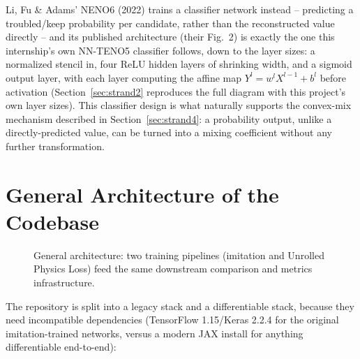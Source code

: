 \documentclass[11pt]{article}
\begin{document}
Li, Fu \& Adams' NENO6 (2022) trains a classifier network instead --
predicting a troubled/keep probability per candidate, rather than the
reconstructed value directly -- and its published architecture (their
Fig.~2) is exactly the one this internship's own NN-TENO5 classifier
follows, down to the layer sizes: a normalized stencil in, four ReLU
hidden layers of shrinking width, and a sigmoid output layer, with each
layer computing the affine map $Y^l = w^l X^{l-1} + b^l$ before activation
(Section~\ref{sec:strand2} reproduces the full diagram with this
project's own layer sizes). This classifier design is what naturally
supports the convex-mix mechanism described in Section~\ref{sec:strand4}:
a probability output, unlike a directly-predicted value, can be turned
into a mixing coefficient without any further transformation.

\section{General Architecture of the Codebase}

\begin{figure}[htbp]
\centering
{}
\caption{General architecture: two training pipelines (imitation and
Unrolled Physics Loss) feed the same downstream comparison and metrics
infrastructure.}
\end{figure}

The repository is split into a legacy stack and a differentiable stack,
because they need incompatible dependencies (TensorFlow 1.15/Keras 2.2.4
for the original imitation-trained networks, versus a modern JAX install
for anything differentiable end-to-end):
\end{document}
